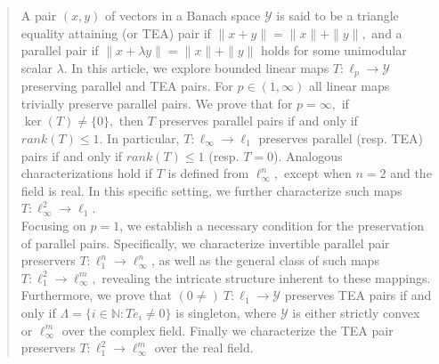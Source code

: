\documentclass{amsart}
\theoremstyle{definition}
\theoremstyle{remark}
\numberwithin{equation}{section}
\begin{document}
\date{}
\maketitle
\begin{abstract}

A pair $(x,y)$ of vectors in a Banach space $\mathcal{Y}$ is said to be a  triangle equality attaining (or TEA)  pair if $\|x+ y\|=\|x\|+\|y\|,$ and a parallel  pair if $\|x+\lambda y\|=\|x\|+\|y\|$ holds for some unimodular scalar $\lambda.$  In this article,  we explore bounded linear maps $T:\ell_p\to \mathcal{Y}$ preserving parallel and TEA pairs. For $p\in(1,\infty)$ all linear maps trivially preserve parallel pairs.  We prove that for $p=\infty,$ if $\ker(T)\neq \{0\},$ then $T$ preserves parallel  pairs if and only if $rank(T)\leq 1$. %
In particular, $T:\ell_\infty\to \ell_1$ preserves parallel (resp. TEA) pairs if and only if $rank(T)\leq 1$ (resp. $T=0$). Analogous characterizations hold if $T$ is defined from $\ell_\infty^n,$ except when $n=2$ and the field is real.  In this specific setting, we further characterize such maps  $T:\ell_\infty^2\to \ell_1.$ \\
Focusing on $p=1$, we establish a necessary condition for the preservation of parallel pairs. Specifically, we characterize invertible parallel pair preservers $T:\ell_1^n\to\ell_\infty^n$, as well as the general class of such maps $T:\ell_1^2 \to \ell_\infty^m,$ revealing the intricate structure inherent to these mappings. Furthermore, we prove that $(0\neq)~T:\ell_1\to \mathcal{Y}$ preserves TEA pairs if and only if $\Lambda=\{i\in \mathbb{N}:Te_i\neq 0\}$ is singleton, where $\mathcal{Y}$ is either strictly convex or $\ell_\infty^m$ over the complex field. Finally we characterize the TEA pair preservers $T:\ell_1^2\to \ell_\infty^m$ over the real field.

\end{abstract}
\end{document}
